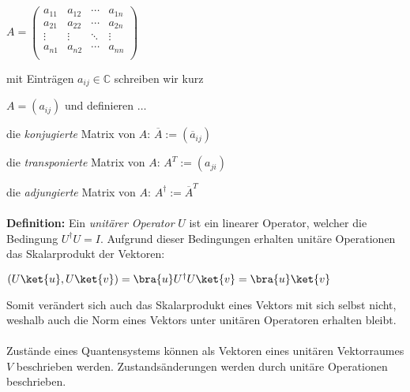 \vspace{0.5cm}
$A=\begin{pmatrix}
a_{11} & a_{12} & \cdots & a_{1n} \\
a_{21} & a_{22} & \cdots  &  a_{2n} \\
\vdots & \vdots & \ddots  & \vdots \\
a_{n1} & a_{n2} & \cdots  & a_{nn} \\
\end{pmatrix}$  
\quad\begin{minipage}{7cm}
mit Einträgen $a_{ij}\in \mathbb{C}$ schreiben wir kurz 

\hspace{2cm}$A=(a_{ij})$  und definieren $\ldots$
\end{minipage}


\vspace{0.3cm}
die \textit{konjugierte} Matrix von $A$: \quad$\overline{A}:=(\overline{a}_{ij})$

\vspace{0.1cm}
die \textit{transponierte} Matrix von $A$: \quad $A^{T}:=(a_{ji})$

\vspace{0.1cm}
die \textit{adjungierte} Matrix von $A$: \quad $A^{\dag}:=\overline{A}^{T}$

\paragraph{}

\textbf{Definition:} Ein \textit{unitärer Operator} $U$ ist ein linearer Operator, welcher die Bedingung $U^\dagger U = I$. Aufgrund dieser Bedingungen erhalten unitäre Operationen das Skalarprodukt der Vektoren:

\vspace{0.3cm}
\centerline{ $(U\ket{u}, U\ket{v}) = \bra{u}U^\dagger U\ket{v} = \bra{u}\ket{v}$ }

\vspace{0.3cm}
Somit verändert sich auch das Skalarprodukt eines Vektors mit sich selbst nicht, weshalb auch die Norm eines Vektors unter unitären Operatoren erhalten bleibt.
\paragraph{}


Zustände eines Quantensystems können als Vektoren eines unitären Vektorraumes $V$ beschrieben werden. Zustandsänderungen werden durch unitäre Operationen beschrieben.


